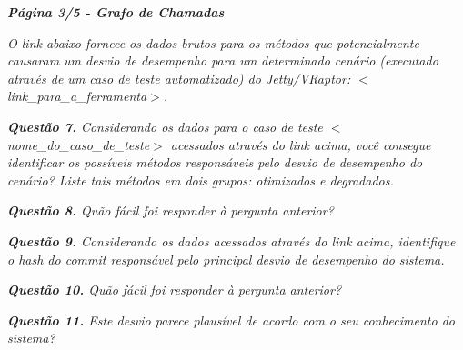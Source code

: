 \begin{framed}
	\noindent \textit{\textbf{Página 3/5 - Grafo de Chamadas}}
	\par
	\noindent \textit{O link abaixo fornece os dados brutos para os métodos que potencialmente causaram um desvio de desempenho para um determinado cenário (executado através de um caso de teste automatizado) do \underline{Jetty/VRaptor}: {\(<\)}link\_para\_a\_ferramenta{\(>\)}.}
	
	\noindent \textit{\textbf{Questão 7.} Considerando os dados para o caso de teste {\(<\)}nome\_do\_caso\_de\_teste{\(>\)} acessados através do link acima, você consegue identificar os possíveis métodos responsáveis pelo desvio de desempenho do cenário? Liste tais métodos em dois grupos: otimizados e degradados.}
	\par
	\noindent \textit{\textbf{Questão 8.} Quão fácil foi responder à pergunta anterior?}
	\par
	\noindent \textit{\textbf{Questão 9.} Considerando os dados acessados através do link acima, identifique o hash do commit responsável pelo principal desvio de desempenho do sistema.}
	\par
	\noindent \textit{\textbf{Questão 10.} Quão fácil foi responder à pergunta anterior?}
	\par
	\noindent \textit{\textbf{Questão 11.} Este desvio parece plausível de acordo com o seu conhecimento do sistema?}
\end{framed}

